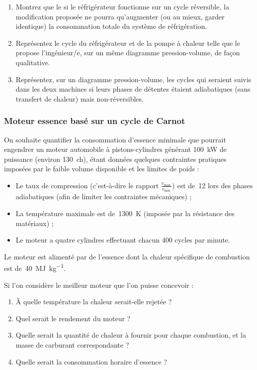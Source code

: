 		\begin{enumerate}
			\item Montrez que le si le réfrigérateur fonctionne sur un cycle réversible, la modification proposée ne pourra qu’augmenter (ou au mieux, garder identique) la consommation totale du système de réfrigération.
			\item Représentez le cycle du réfrigérateur et de la pompe à chaleur telle que le propose l’ingénieur/e, sur un même diagramme pression-volume, de façon qualitative.
			\item Représentez, sur un diagramme pression-volume, les cycles qui seraient suivis dans les deux machines si leurs phases de détentes étaient adiabatiques (sans transfert de chaleur) mais non-réversibles.
		\end{enumerate}


\subsubsection{Moteur essence basé sur un cycle de Carnot}
\label{exo_carnot_quatre_cylindres}

	On souhaite quantifier la consommation d’essence minimale que pourrait engendrer un moteur automobile à pistons-cylindres générant \SI{100}{\kilo\watt} de puissance (environ \SI{130}{ch}), étant données quelques contraintes pratiques imposées par le faible volume disponible et les limites de poids :
		
	\begin{itemize}
		\item Le taux de compression (c’est-à-dire le rapport $\frac{v_\text{max.}}{v_\text{min.}}$) est de~\num{12} lors des phases adiabatiques (afin de limiter les contraintes mécaniques) ;
		\item La température maximale est de~\SI{1300}{\kelvin} (imposée par la résistance des matériaux) ;
		\item Le moteur a quatre cylindres effectuant chacun \num{400} cycles par minute.
	\end{itemize}
	
	Le moteur est alimenté par de l’essence dont la chaleur spécifique de combustion est de~\SI{40}{\mega\joule\per\kilogram}.
	
	Si l’on considère le meilleur moteur que l’on puisse concevoir :
	
	\begin{enumerate}
		\item À quelle température la chaleur serait-elle rejetée ?
		\item Quel serait le rendement du moteur ?
		\item Quelle serait la quantité de chaleur à fournir pour chaque combustion, et la masse de carburant correspondante ?
		\item Quelle serait la consommation horaire d’essence ?
	\end{enumerate}

